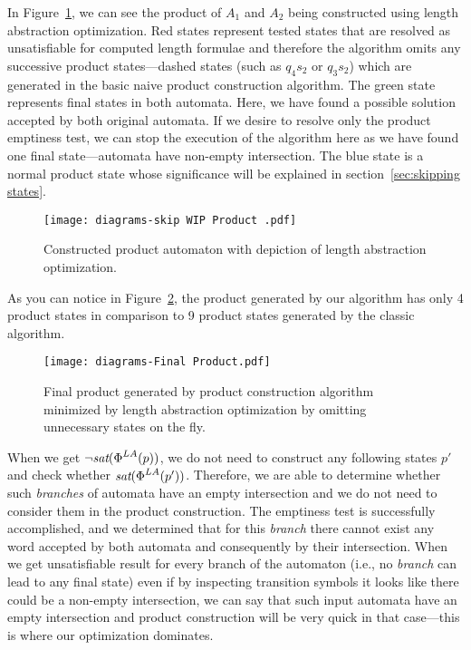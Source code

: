 In Figure~\ref{fig:product_WIP}, we can see the product of $A_1$ and $A_2$ being constructed using length abstraction optimization. Red states represent tested states that are resolved as unsatisfiable for computed length formulae and therefore the algorithm omits any successive product states---dashed states (such as $q_4s_2$ or $q_3s_2$) which are generated in the basic naive product construction algorithm. The green state represents final states in both automata. Here, we have found a possible solution accepted by both original automata. If we desire to resolve only the product emptiness test, we can stop the execution of the algorithm here as we have found one final state---automata have non-empty intersection. The blue state is a normal product state whose significance will be explained in section~\ref{sec:skipping states}.

\begin{figure}[ht]
	\centering
	\texttt{[image: diagrams-skip WIP Product .pdf]}
	\caption{Constructed product automaton with depiction of length abstraction optimization.}
	\label{fig:product_WIP}
\end{figure}

As you can notice in Figure~\ref{fig:product_final}, the product generated by our algorithm has only 4 product states in comparison to 9 product states generated by the classic algorithm.

\begin{figure}[ht]
	\centering
	\texttt{[image: diagrams-Final Product.pdf]}
	\caption{Final product generated by product construction algorithm minimized by length abstraction optimization by omitting unnecessary states on the fly.}
	\label{fig:product_final}
\end{figure}


When we get $\neg \emph{sat}(\emph{$\Phi$}^{LA}(p))$, we do not need to construct any following states $p'$ and check whether $\emph{sat}(\emph{$\Phi$}^{LA}(p'))$. Therefore, we are able to determine whether such \textit{branches} of automata have an empty intersection and we do not need to consider them in the product construction. The emptiness test is successfully accomplished, and we determined that for this \emph{branch} there cannot exist any word accepted by both automata and consequently by their intersection. When we get unsatisfiable result for every branch of the automaton (i.e., no \emph{branch} can lead to any final state) even if by inspecting transition symbols it looks like there could be a non-empty intersection, we can say that such input automata have an empty intersection and product construction will be very quick in that case---this is where our optimization dominates.

